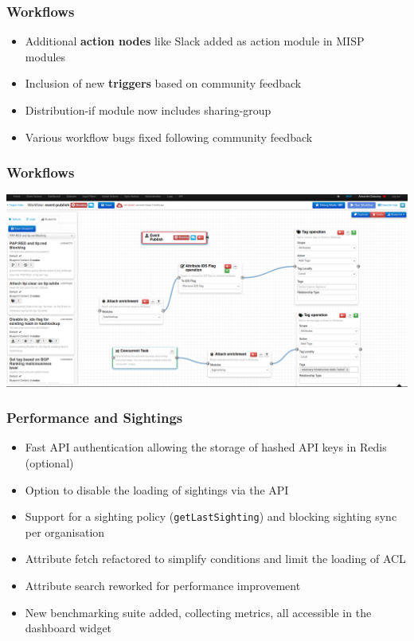 \begin{frame}
  \frametitle{Workflows}
  \begin{itemize}
     \item Additional \textbf{action nodes} like Slack added as action module in MISP modules
     \item Inclusion of new \textbf{triggers} based on community feedback
     \item Distribution-if module now includes sharing-group
     \item Various workflow bugs fixed following community feedback
  \end{itemize}
\end{frame}

\begin{frame}
\frametitle{Workflows}
\begin{center}
\includegraphics[scale=0.17]{images/workflows_filtered.png}
\end{center}
\end{frame}

\begin{frame}
  \frametitle{Performance and Sightings}
  \begin{itemize}
     \item Fast API authentication allowing the storage of hashed API keys in Redis (optional)
     \item Option to disable the loading of sightings via the API
     \item Support for a sighting policy (\texttt{getLastSighting}) and blocking sighting sync per organisation
     \item Attribute fetch refactored to simplify conditions and limit the loading of ACL
     \item Attribute search reworked for performance improvement
     \item New benchmarking suite added, collecting metrics, all accessible in the dashboard widget
  \end{itemize}
\end{frame}

